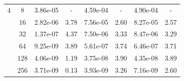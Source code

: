 \begin{table}[htbp]
\begin{center}
\begin{tabular}{| c | c | c c | c c | c c |}
			\hline

			4	& 8 & 3.86e-05 & - & 4.59e-04 & - & 4.90e-04 & - \\
			& 16 & 2.82e-06 & 3.78 & 7.56e-05 & 2.60 & 8.27e-05 & 2.57 \\
			& 32 & 1.37e-07 & 4.37 & 7.50e-06 & 3.33 & 8.47e-06 & 3.29 \\
			& 64 & 9.25e-09 & 3.89 & 5.61e-07 & 3.74 & 6.46e-07 & 3.71 \\
			& 128 & 4.06e-09 & 1.19 & 3.75e-08 & 3.90 & 4.35e-08 & 3.89 \\
			& 256 & 3.71e-09 & 0.13 & 3.93e-09 & 3.26 & 7.16e-09 & 2.60 \\

			\hline
		\end{tabular}
	\end{center}
\end{table}


